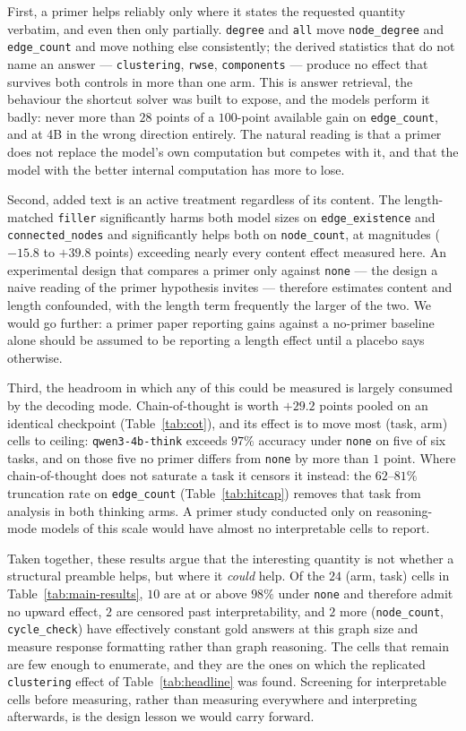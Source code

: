 \documentclass[11pt]{article}
\begin{document}
First, a primer helps reliably only where it states the requested quantity
verbatim, and even then only partially. \texttt{degree} and \texttt{all}
move \texttt{node\_degree} and \texttt{edge\_count} and move nothing else
consistently; the derived statistics that do not name an answer ---
\texttt{clustering}, \texttt{rwse}, \texttt{components} --- produce no
effect that survives both controls in more than one arm. This is answer
retrieval, the behaviour the shortcut solver was built to expose, and the
models perform it badly: never more than $28$ points of a $100$-point
available gain on \texttt{edge\_count}, and at 4B in the wrong direction
entirely. The natural reading is that a primer does not replace the
model's own computation but competes with it, and that the model with the
better internal computation has more to lose.

Second, added text is an active treatment regardless of its content. The
length-matched \texttt{filler} significantly harms both model sizes on
\texttt{edge\_existence} and \texttt{connected\_nodes} and significantly
helps both on \texttt{node\_count}, at magnitudes ($-15.8$ to $+39.8$
points) exceeding nearly every content effect measured here. An
experimental design that compares a primer only against \texttt{none} ---
the design a naive reading of the primer hypothesis invites --- therefore
estimates content and length confounded, with the length term frequently
the larger of the two. We would go further: a primer paper reporting gains
against a no-primer baseline alone should be assumed to be reporting a
length effect until a placebo says otherwise.

Third, the headroom in which any of this could be measured is largely
consumed by the decoding mode. Chain-of-thought is worth $+29.2$ points
pooled on an identical checkpoint (Table~\ref{tab:cot}), and its effect is
to move most (task, arm) cells to ceiling: \texttt{qwen3-4b-think} exceeds
$97\%$ accuracy under \texttt{none} on five of six tasks, and on those five
no primer differs from \texttt{none} by more than $1$ point. Where
chain-of-thought does not saturate a task it censors it instead: the
$62$--$81\%$ truncation rate on \texttt{edge\_count}
(Table~\ref{tab:hitcap}) removes that task from analysis in both thinking
arms. A primer study conducted only on reasoning-mode models of this scale
would have almost no interpretable cells to report.

Taken together, these results argue that the interesting quantity is not
whether a structural preamble helps, but where it \emph{could} help. Of the
$24$ (arm, task) cells in Table~\ref{tab:main-results}, $10$ are at or above
$98\%$ under \texttt{none} and therefore admit no upward effect, $2$ are
censored past interpretability, and $2$ more (\texttt{node\_count},
\texttt{cycle\_check}) have effectively constant gold answers at this graph
size and measure response formatting rather than graph reasoning. The cells
that remain are few enough to enumerate, and they are the ones on which the
replicated \texttt{clustering} effect of Table~\ref{tab:headline} was
found. Screening for interpretable cells before measuring, rather than
measuring everywhere and interpreting afterwards, is the design lesson we
would carry forward.
\end{document}
